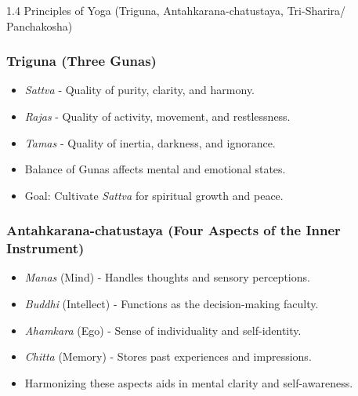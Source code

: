 \begin{frame}[fragile]\frametitle{}
\begin{center}
{\Large 1.4 Principles of Yoga (Triguna, Antahkarana-chatustaya, Tri-Sharira/ Panchakosha)}
\end{center}
\end{frame}

\begin{frame}[fragile]\frametitle{Triguna (Three Gunas)}

      \begin{itemize}
		\item \textit{Sattva} - Quality of purity, clarity, and harmony.
		\item \textit{Rajas} - Quality of activity, movement, and restlessness.
		\item \textit{Tamas} - Quality of inertia, darkness, and ignorance.
		\item Balance of Gunas affects mental and emotional states.
		\item Goal: Cultivate \textit{Sattva} for spiritual growth and peace.
	  \end{itemize}

\end{frame}

\begin{frame}[fragile]\frametitle{Antahkarana-chatustaya (Four Aspects of the Inner Instrument)}

      \begin{itemize}
		\item \textit{Manas} (Mind) - Handles thoughts and sensory perceptions.
		\item \textit{Buddhi} (Intellect) - Functions as the decision-making faculty.
		\item \textit{Ahamkara} (Ego) - Sense of individuality and self-identity.
		\item \textit{Chitta} (Memory) - Stores past experiences and impressions.
		\item Harmonizing these aspects aids in mental clarity and self-awareness.
	  \end{itemize}

\end{frame}

